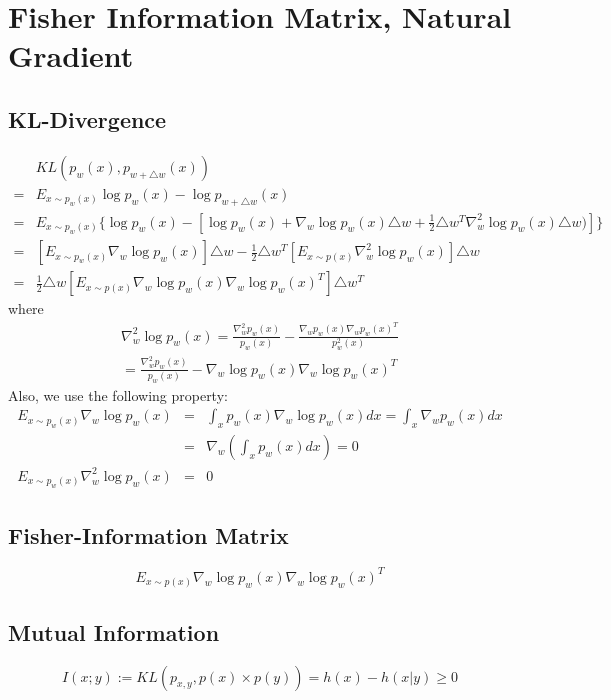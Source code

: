 \documentclass{article}
\begin{document}
\section{Fisher Information Matrix, Natural Gradient}
\subsection{KL-Divergence}
\begin{eqnarray*}
&KL(p_w(x), p_{w+\triangle w}(x)) \\
=& E_{x\sim p_w(x)} \log p_w(x) - \log p_{w+\triangle w}(x)\\
=& E_{x\sim p_w(x)} \{\log p_w(x) - [\log p_w(x)+\nabla_w \log p_w(x)\triangle w + \frac{1}{2}\triangle w^T \nabla^2_w \log p_w(x)\triangle w)]\} \\
=& [E_{x\sim p_w(x)}\nabla_w \log p_w(x)]\triangle w -  \frac{1}{2}\triangle w^T [E_{x\sim p(x)}\nabla^2_w \log p_w(x)]\triangle w\\
= & \frac{1}{2}\triangle w[E_{x\sim p(x)}\nabla_w \log p_w(x)\nabla_w \log p_w(x)^T]\triangle w^T
\end{eqnarray*}
where
\begin{eqnarray*}
\nabla^2_w \log p_w(x) = \frac{\nabla^2_w p_w(x)}{p_w(x)} - \frac{\nabla_w p_w(x)\nabla_w p_w(x)^T}{p_w^2(x)} \\
= \frac{\nabla^2_w p_w(x)}{p_w(x)} - \nabla_w \log p_w(x)\nabla_w \log p_w(x)^T
\end{eqnarray*}
Also, we use the following property:
\begin{eqnarray*}
E_{x\sim p_w(x)}\nabla_w \log p_w(x) &=& \int_x p_w(x)\nabla_w \log p_w(x)dx=\int_x \nabla_w p_w(x)dx\\
&=&\nabla_w(\int_x  p_w(x)dx) = 0\\
E_{x\sim p_w(x)}\nabla^2_w \log p_w(x) &=& 0
\end{eqnarray*}
\subsection{Fisher-Information Matrix}
\begin{equation*}
E_{x\sim p(x)}\nabla_w \log p_w(x)\nabla_w \log p_w(x)^T
\end{equation*}
\subsection{Mutual Information}
\begin{equation}
I(x;y) := KL(p_{x,y}, p(x) \times p(y)) = h(x) - h(x|y)\ge 0
\end{equation}
\end{document}
